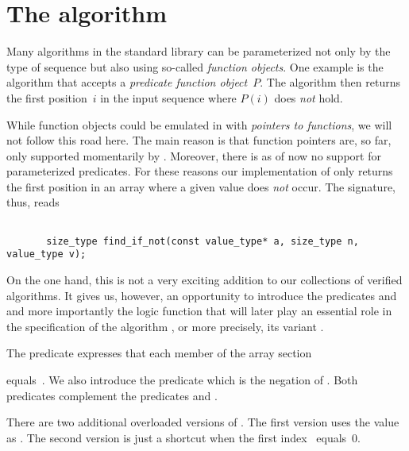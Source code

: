 

\section{The \findifnot algorithm }
\label{sec:findifnot}

Many algorithms in the \cxx standard library can be parameterized not only by the type
of sequence but also using so-called \emph{function objects}.
One example is the \findifnot algorithm that accepts a 
\emph{predicate function object}~$P$.
The algorithm then returns the first position~$i$ in the input sequence where
$P(i)$ does \emph{not} hold.

While function objects could be emulated in \isoc with \emph{pointers to functions},
we will not follow this road here.
The main reason is that function pointers are, so far, only supported momentarily by \framac.
Moreover, there is as of now no support for parameterized \acsl predicates.
For these reasons our implementation of \findifnot only returns the first position
in an array where a given value does \emph{not} occur.
The signature, thus, reads 

\begin{lstlisting}[style=acsl-block]

       size_type find_if_not(const value_type* a, size_type n, value_type v);
\end{lstlisting}

On the one hand, this is not a very exciting addition to our
collections of verified algorithms.
It gives us, however, an opportunity to introduce the predicates
and 
and more importantly the logic function
that will later play
an essential role in the specification of the algorithm \removecopy,
or more precisely, its variant .



\clearpage

The predicate \AllEqual expresses that each member of the array section

 equals~.
We also introduce the predicate \SomeNotEqual which is the negation of \AllEqual.
Both predicates complement the predicates 
 and 
.

There are two additional overloaded versions of \AllEqual.
The first version uses the value  as .
The second version is just a shortcut when the first index~ equals~0.

